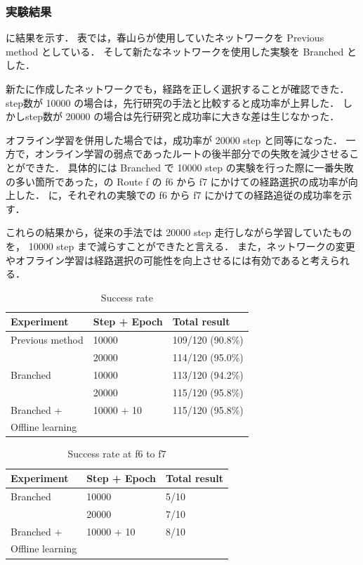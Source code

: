 \subsubsection{実験結果}
に結果を示す．
表では，春山らが使用していたネットワークを Previous method としている．
そして新たなネットワークを使用した実験を Branched とした．

新たに作成したネットワークでも，経路を正しく選択することが確認できた．
step数が 10000 の場合は，先行研究の手法と比較すると成功率が上昇した．
しかしstep数が 20000 の場合は先行研究と成功率に大きな差は生じなかった．

オフライン学習を併用した場合では，成功率が 20000 step と同等になった．
一方で，オンライン学習の弱点であったルートの後半部分での失敗を減少させることができた．
具体的には Branched で 10000 step の実験を行った際に一番失敗の多い箇所であった，の Route f の f6 から f7 にかけての経路選択の成功率が向上した．
に，それぞれの実験での f6 から f7 にかけての経路追従の成功率を示す．

これらの結果から，従来の手法では 20000 step 走行しながら学習していたものを， 10000 step まで減らすことができたと言える．
また，ネットワークの変更やオフライン学習は経路選択の可能性を向上させるには有効であると考えられる．

\begin{table}[]
  \centering
  \caption{Success rate}
  \begin{tabular}{lll}
  \hline
  Experiment         & Step + Epoch & Total result     \\ \hline
  Previous method    & 10000        & 109/120 (90.8\%) \\
                     & 20000        & 114/120 (95.0\%) \\ \hline
  Branched           & 10000        & 113/120 (94.2\%) \\ 
                     & 20000        & 115/120 (95.8\%) \\ \hline
  Branched +         & 10000 + 10   & 115/120 (95.8\%) \\ 
  Offline learning   &              &                  \\ \hline
  \end{tabular}
  \label{tab:result}
\end{table}

\begin{table}[]
  \centering
  \caption{Success rate at f6 to f7}
  \begin{tabular}{lll}
  \hline
  Experiment         & Step + Epoch & Total result \\ \hline
  Branched           & 10000        & 5/10         \\ 
                     & 20000        & 7/10         \\ \hline
  Branched +         & 10000 + 10   & 8/10         \\ 
  Offline learning   &              &              \\ \hline
  \end{tabular}
  \label{tab:f_result}
\end{table}